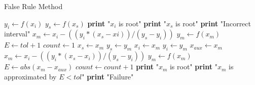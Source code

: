\documentclass{article}
\begin{document}
  \begin{algorithm}
    \caption{False Rule Method}
    \begin{algorithmic}[1]
        \State $y_{i} \gets f(x_{i})$
        \State $y_{s} \gets f(x_{s})$
          \State \textbf{print} "$x_{i}$ is root"
          \State \textbf{print} "$x_{s}$ is root"
          \State \textbf{print} "Incorrect interval"
        \Else
          \State $x_{m} \gets x_{i} - ((y_{i} * (x_{s} - x{i})) / (y_{s} - y_{i}))$
          \State $y_{m} \gets f(x_{m})$
          \State $E \gets tol + 1$
          \State $count \gets 1$
              \State $x_{s} \gets x_{m}$
              \State $y_{s} \gets y_{m}$
            \Else
              \State $x_{i} \gets x_{m}$
              \State $y_{i} \gets y_{m}$
            \EndIf
            \State $x_{aux} \gets x_{m}$
            \State $x_{m} \gets x_{i} - ((y_{i} * (x_{s} - x_{i})) / (y_{s} - y_{i}))$
            \State $y_{m} \gets f(x_{m})$
            \State $E \gets abs(x_{m} - x_{aux})$
            \State $count \gets count + 1$
          \EndWhile
            \State \textbf{print} "$x_{m}$ is root"
            \State \textbf{print} "$x_{m}$ is approximated by $E < tol$"
          \Else
            \State \textbf{print} "Failure"
          \EndIf
        \EndIf
      \EndProcedure
    \end{algorithmic}
  \end{algorithm}
\end{document}
